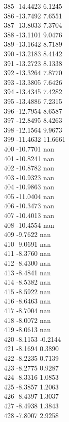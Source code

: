 \documentclass[11pt]{article}
\theoremstyle{definition}
\theoremstyle{plain}
\begin{document}
{385 -14.4423 6.1245\\
386 -13.7492 7.6551\\
387 -13.8033 7.3704\\
388 -13.1101 9.0476\\
389 -13.1642 8.7189\\
390 -13.2183 8.4142\\
391 -13.2723 8.1338\\
392 -13.3264 7.8770\\
393 -13.3805 7.6426\\
394 -13.4345 7.4282\\
395 -13.4886 7.2315\\
396 -12.7954 8.6587\\
397 -12.8495 8.4263\\
398 -12.1564 9.9673\\
399 -11.4632 11.6661\\
400 -10.7701 nan\\
401 -10.8241 nan\\
402 -10.8782 nan\\
403 -10.9323 nan\\
404 -10.9863 nan\\
405 -11.0404 nan\\
406 -10.3473 nan\\
407 -10.4013 nan\\
408 -10.4554 nan\\
409 -9.7622 nan\\
410 -9.0691 nan\\
411 -8.3760 nan\\
412 -8.4300 nan\\
413 -8.4841 nan\\
414 -8.5382 nan\\
415 -8.5922 nan\\
416 -8.6463 nan\\
417 -8.7004 nan\\
418 -8.0072 nan\\
419 -8.0613 nan\\
420 -8.1153 -0.2144\\
421 -8.1694 0.3890\\
422 -8.2235 0.7139\\
423 -8.2775 0.9287\\
424 -8.3316 1.0853\\
425 -8.3857 1.2063\\
426 -8.4397 1.3037\\
427 -8.4938 1.3843\\
428 -7.8007 2.9258\\
}
\end{document}
